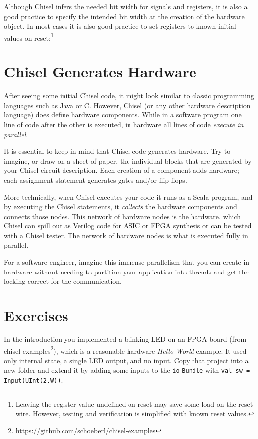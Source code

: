 \documentclass[%
    10pt,
    headinclude, footexclude,
    openright, %
    notitlepage,
    cleardoubleempty,
    headsepline,
    pointlessnumbers,
    bibtotoc, idxtotoc,
    ]{scrbook}
\newcommand{\code}[1]{{\lstinline[basicstyle=\small\ttfamily]{#1}}}
\newcommand{\myref}[2]{\href{#1}{#2}}
\renewcommand{\myref}[2]{{#2}{\footnote{\url{#1}}}}
\begin{document}

\noindent Although Chisel infers the needed bit width for signals and registers, it is also a good practice
to specify the intended bit width at the creation of the hardware object.
In most cases it is also good practice to set registers to known initial values on
reset:\footnote{Leaving the register value undefined on reset may save some load on the reset
wire. However, testing and verification is simplified with known reset values.}


\section{Chisel Generates Hardware}

After seeing some initial Chisel code, it might look similar to classic programming
languages such as Java or C. However, Chisel (or any other hardware description
language) does define hardware components. While in a software program one
line of code after the other is executed, in hardware all lines of code
\emph{execute in parallel}.

It is essential to keep in mind that Chisel code generates hardware.
Try to imagine, or draw on a sheet of paper, the individual blocks that
are generated by your Chisel circuit description.
Each creation of a component adds hardware; each assignment statement
generates gates and/or flip-flops.

More technically, when Chisel executes your code it runs as a Scala program, and
by executing the Chisel statements, it \emph{collects} the hardware components
and connects those nodes. This network of hardware nodes is the hardware,
which Chisel can spill out as Verilog code for ASIC or FPGA synthesis or can be
tested with a Chisel tester.
The network of hardware nodes is what is executed fully in parallel.

For a software engineer, imagine this immense parallelism that you can
create in hardware without needing to partition your application into threads
and get the locking correct for the communication.


\section{Exercises}

In the introduction you implemented a blinking LED on an FPGA board
(from \myref{https://github.com/schoeberl/chisel-examples}{chisel-examples}), which is a reasonable
hardware \emph{Hello World} example. It used only internal state, a single LED output, and no input.
Copy that project into a new folder and extend it by adding some inputs to the \code{io} \code{Bundle}
with \code{val sw = Input(UInt(2.W))}.
\end{document}

